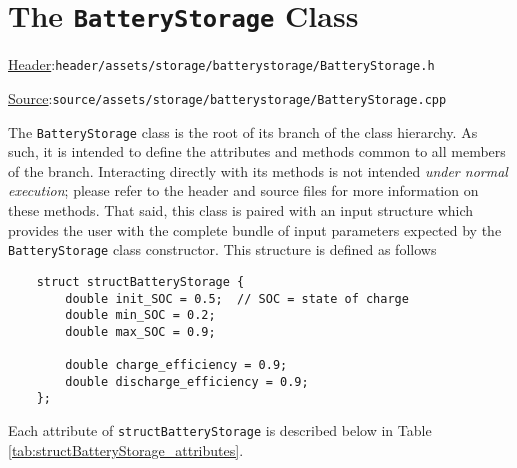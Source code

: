 \documentclass[12pt, letterpaper]{report}
\begin{document}
\section{The \texttt{BatteryStorage} Class}

\begin{large}
\noindent\underline{Header}:\quad\texttt{header/assets/storage/batterystorage/BatteryStorage.h}\par
\noindent\underline{Source}:\quad\texttt{source/assets/storage/batterystorage/BatteryStorage.cpp}\par
\end{large}
\vspace{5mm}

The \texttt{BatteryStorage} class is the root of its branch of the class hierarchy. As such, it is intended to define the attributes and methods common to all members of the branch. Interacting directly with its methods is not intended \textit{under normal execution}; please refer to the header and source files for more information on these methods. That said, this class is paired with an input structure which provides the user with the complete bundle of input parameters expected by the \texttt{BatteryStorage} class constructor. This structure is defined as follows

\begin{verbatim}
    struct structBatteryStorage {
        double init_SOC = 0.5;  // SOC = state of charge
        double min_SOC = 0.2;
        double max_SOC = 0.9;
        
        double charge_efficiency = 0.9;
        double discharge_efficiency = 0.9;
    };
\end{verbatim}

\noindent Each attribute of \texttt{structBatteryStorage} is described below in Table \ref{tab:structBatteryStorage_attributes}.
\end{document}
